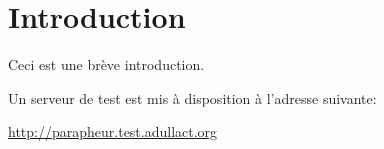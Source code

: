 \section*{Introduction}
Ceci est une brève introduction.

Un serveur de test est mis à disposition à l'adresse suivante:

\href{http://parapheur.test.adullact.org}{http://parapheur.test.adullact.org}